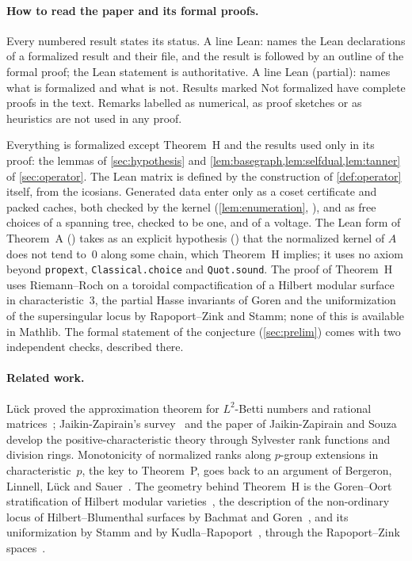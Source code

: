 \paragraph{How to read the paper and its formal proofs.} Every numbered result states its status. A line
\textsf{Lean:} names the Lean declarations of a formalized result and their file, and the result is followed by an
outline of the formal proof; the Lean statement is authoritative. A line \textsf{Lean (partial):} names what is
formalized and what is not. Results marked \textsf{Not formalized} have complete proofs in the text. Remarks labelled as
numerical, as proof sketches or as heuristics are not used in any proof.

Everything is formalized except Theorem~H and the results used only in its proof: the lemmas of \cref{sec:hypothesis}
and \cref{lem:basegraph,lem:selfdual,lem:tanner} of \cref{sec:operator}. The Lean matrix is defined by the construction
of \cref{def:operator} itself, from the icosians. Generated data enter only as a coset certificate and packed caches,
both checked by the kernel (\cref{lem:enumeration}, ), and as free choices of a spanning
tree, checked to be one, and of a voltage. The Lean form of Theorem~A () takes as an
explicit hypothesis () that the normalized kernel of $A$ does not tend to~$0$ along some
chain, which Theorem~H implies; it uses no axiom beyond \texttt{propext},
\texttt{Classical.choice} and \texttt{Quot.sound}. The proof of Theorem~H uses Riemann--Roch on a toroidal
compactification of a Hilbert modular surface in characteristic~$3$, the partial Hasse invariants of Goren and the
uniformization of the supersingular locus by Rapoport--Zink and Stamm; none of this is available in Mathlib. The formal
statement of the conjecture (\cref{sec:prelim}) comes with two independent checks, described there.

\paragraph{Related work.} L\"uck proved the approximation theorem for $L^2$-Betti numbers and rational
matrices~\cite{Luck1994}; Jaikin-Zapirain's survey~\cite{JaikinSurvey2019} and the paper of Jaikin-Zapirain and
Souza~\cite{JaikinSouza2026} develop the positive-characteristic theory through Sylvester rank functions and division
rings. Monotonicity of normalized ranks along $p$-group extensions in characteristic~$p$, the key to Theorem~P, goes back
to an argument of Bergeron, Linnell, L\"uck and Sauer~\cite[Lemma~4.1]{BLLS2014}. The geometry behind Theorem~H is the
Goren--Oort stratification of Hilbert modular varieties~\cite{GorenOort2000,Goren2001}, the description of the
non-ordinary locus of Hilbert--Blumenthal surfaces by Bachmat and Goren~\cite{BachmatGoren1999}, and its uniformization
by Stamm and by Kudla--Rapoport~\cite{Stamm1997,KudlaRapoport1999}, through the Rapoport--Zink
spaces~\cite{RapoportZink1996}.

